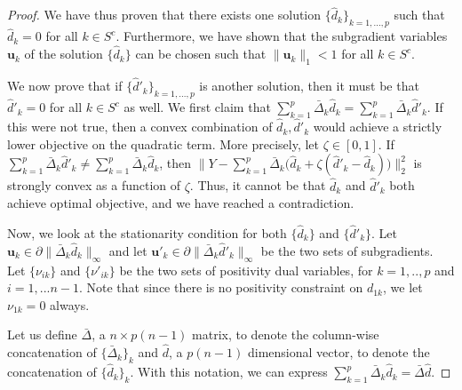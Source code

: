 \documentclass[12pt,pdftex,aos,noinfoline,addressasfootnote]{imsart}
\begin{document}
\begin{proof}
We have thus proven that there exists one solution $\{ \hat{d}_k
\}_{k=1,...,p}$ such that $\hat{d}_k = 0$ for all $k \in
S^c$. Furthermore, we have shown that the subgradient variables
$\mathbf{u}_k$ of the solution $\{ \hat{d}_k \}$ can be chosen such
that $\| \mathbf{u}_k \|_1 < 1$ for all $k \in S^c$.  

We now prove that if $\{ \hat{d}'_k \}_{k = 1,..., p}$ is another
solution, then it must be that $\hat{d}'_k = 0$ for all $k \in S^c$ as
well.  We first claim that $\sum_{k=1}^p \bar{\Delta}_k \hat{d}_k =
\sum_{k=1}^p \bar{\Delta}_k \hat{d}'_k$. If this were not true, then a
convex combination of $\hat{d}_k, \hat{d}'_k$ would achieve a strictly
lower objective on the quadratic term. More precisely, let $\zeta \in
[0,1]$. If $\sum_{k=1}^p \bar{\Delta}_k \hat{d}'_k \neq \sum_{k=1}^p
\bar{\Delta}_k \hat{d}_k$, then $\| Y - \sum_{k=1}^p \bar{\Delta}_k
\big( \hat{d}_k + \zeta ( \hat{d}'_k - \hat{d}_k) \big) \|_2^2$ is
strongly convex as a function of $\zeta$. Thus, it cannot be that
$\hat{d}_k$ and $\hat{d}'_k$ both achieve optimal objective, and we
have reached a contradiction.

Now, we look at the stationarity condition for both $\{ \hat{d}_k \}$
and $\{ \hat{d}'_k \}$. Let $\mathbf{u}_k \in \partial \|
\bar{\Delta}_k \hat{d}_k \|_\infty$ and let $\mathbf{u}'_k
\in \partial \| \bar{\Delta}_k \hat{d}'_k \|_\infty$ be the two sets
of subgradients. Let $\{ \nu_{ik} \}$ and $\{
\nu'_{ik} \}$ be the two sets of positivity dual
variables, for $k=1,..,p$ and $i=1,...n-1$.  Note that since there is no positivity constraint on
$d_{1k}$, we let $\nu_{1k} = 0$ always.

Let us define $\bar{\Delta}$, a $n \times p(n-1)$ matrix, to denote the column-wise concatenation of $\{ \bar{\Delta}_k \}_k$ and $\hat{d}$, a $p(n-1)$ dimensional vector, to denote the concatenation of $\{ \hat{d}_k \}_k$. With this notation, we can express $\sum_{k=1}^p \bar{\Delta}_k \hat{d}_k = \bar{\Delta} \hat{d}$.


\end{proof}
\end{document}
